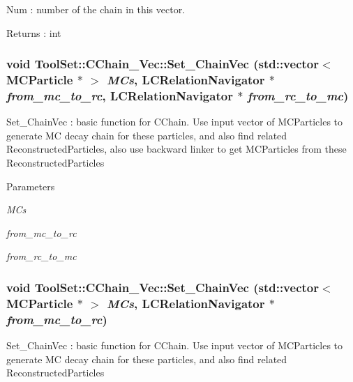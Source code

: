 Num : number of the chain in this vector. \begin{DoxyReturn}{Returns}
: int 
\end{DoxyReturn}
\hypertarget{classToolSet_1_1CChain__Vec_ab517a961cbc4260575cd6531d26381fe}{
\subsubsection[{Set\_\-ChainVec}]{\setlength{\rightskip}{0pt plus 5cm}void ToolSet::CChain\_\-Vec::Set\_\-ChainVec (std::vector$<$ MCParticle $\ast$ $>$ {\em MCs}, \/  LCRelationNavigator $\ast$ {\em from\_\-mc\_\-to\_\-rc}, \/  LCRelationNavigator $\ast$ {\em from\_\-rc\_\-to\_\-mc})}}
\label{classToolSet_1_1CChain__Vec_ab517a961cbc4260575cd6531d26381fe}


Set\_\-ChainVec : basic function for CChain. Use input vector of MCParticles to generate MC decay chain for these particles, and also find related ReconstructedParticles, also use backward linker to get MCParticles from these ReconstructedParticles


\begin{DoxyParams}{Parameters}
\item[{\em MCs}]\item[{\em from\_\-mc\_\-to\_\-rc}]\item[{\em from\_\-rc\_\-to\_\-mc}]\end{DoxyParams}
\hypertarget{classToolSet_1_1CChain__Vec_a30f79cdea8e84210e77e849722f59d2f}{
\subsubsection[{Set\_\-ChainVec}]{\setlength{\rightskip}{0pt plus 5cm}void ToolSet::CChain\_\-Vec::Set\_\-ChainVec (std::vector$<$ MCParticle $\ast$ $>$ {\em MCs}, \/  LCRelationNavigator $\ast$ {\em from\_\-mc\_\-to\_\-rc})}}
\label{classToolSet_1_1CChain__Vec_a30f79cdea8e84210e77e849722f59d2f}


Set\_\-ChainVec : basic function for CChain. Use input vector of MCParticles to generate MC decay chain for these particles, and also find related ReconstructedParticles


